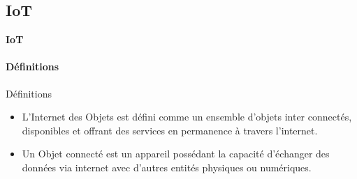 \documentclass[aspectratio=169,professionalfonts, 12pt]{beamer}
\begin{document}
\subsection{IoT}
\begin{frame}{\textbf{IoT}}
\framesubtitle{Définitions}
\begin{minipage}{0.6\textwidth}
	\begin{block}{Définitions}
	\begin{itemize}
	\item<1-> L’Internet des Objets est défini comme un ensemble d'objets inter connectés, disponibles et offrant des services en permanence à travers l’internet.
	\item<2-> Un Objet connecté est un appareil possédant la capacité d’échanger des données via internet avec d’autres entités physiques ou numériques.
	\end{itemize}
	\end{block}
\end{minipage}
\begin{minipage}{2cm}

\end{minipage}
\begin{minipage}{0.3\textwidth}
\end{minipage}	
\end{frame}
\end{document}

